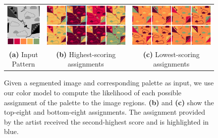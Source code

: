 \begin{figure}[ht]
\begin{tabular}{ccc}
\includegraphics[width=.15\linewidth]{figs/permutationTemplatePalette} & \includegraphics[width=.4\linewidth]{figs/permutationBest8} & \includegraphics[width=.4\linewidth]{figs/permutationWorst8} %
  \\
\textbf{(a)} Input Pattern & \textbf{(b)} Highest-scoring assignments & \textbf{(c)} Lowest-scoring assignments %
\\
\end{tabular}

\caption{Given a segmented image and corresponding palette as input, we use our color model to compute the likelihood of each possible assignment of the palette to the image regions. \textbf{(b)} and \textbf{(c)} show the top-eight and bottom-eight assignments. The assignment provided by the artist received the second-highest score and is highlighted in blue.}
\label{fig:permutation}
\end{figure}

